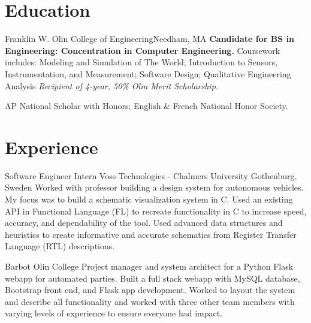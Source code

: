 \documentclass[11 pt]{moderncv}
\begin{document}
\maketitle

\vspace{-.6in}

\section{Education}

{Franklin W. Olin College of Engineering}{}{Needham, MA}{}
{
	\textbf{Candidate for BS in Engineering: Concentration in Computer Engineering.}
	  Coursework includes:
    Modeling and Simulation of The World;
    Introduction to Sensors, Instrumentation, and Measurement;
    Software Design;
    Qualitative Engineering Analysis
	\newline
	\textit{Recipient of 4-year, 50\% Olin Merit Scholarship.}
}

{
	AP National Scholar with Honors; English \& French National Honor Society.
	\begin{flushright}
	\vspace {-0.3 in}
	\end{flushright}
	\vspace {-0.1 in}
}

\section{Experience}
\vspace{0.06 in}

{Software Engineer Intern}
{Voss Technologies - Chalmers University}
{Gothenburg, Sweden}
{}
{Worked with professor building a design system for autonomous vehicles. My focus was to build a schematic visualization system in C. Used an existing API in Functional Language (FL) to recreate functionality in C to increase speed, accuracy, and dependability of the tool. Used advanced data structures and heuristics to create informative and accurate schematics from Register Transfer Language (RTL) descriptions.}

{Barbot}
{Olin College}
{}
{}
{Project manager and system architect for a Python Flask webapp for automated parties. Built a full stack webapp with MySQL database, Bootstrap front end, and Flask app development. Worked to layout the system and describe all functionality and worked with three other team members with varying levels of experience to ensure everyone had impact. }
\end{document}
